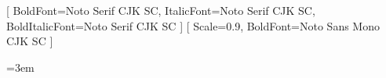 \usepackage{fontspec}
\setmainfont{Noto Serif CJK SC}[
  BoldFont=Noto Serif CJK SC,
  ItalicFont=Noto Serif CJK SC,
  BoldItalicFont=Noto Serif CJK SC
]
\setmonofont{Noto Sans Mono CJK SC}[
  Scale=0.9,
  BoldFont=Noto Sans Mono CJK SC
]

\usepackage[a4paper,margin=2.5cm,top=2cm,bottom=2.5cm]{geometry}
\usepackage{setspace}
\onehalfspacing

\usepackage{fancyhdr}
\fancyhf{}
\fancyfoot[C]{\thepage}
\renewcommand{\headrulewidth}{0.4pt}
\pagestyle{fancy}

\usepackage{xcolor}
\usepackage{hyperref}
\hypersetup{
  colorlinks=true,
  linkcolor=linkblue,
  urlcolor=linkblue,
  citecolor=linkblue
}

\usepackage{longtable}
\usepackage{booktabs}
\usepackage{array}
\usepackage{etoolbox}
\setlength{\tabcolsep}{4pt}
\renewcommand{\arraystretch}{1.2}


\let\oldtexttt\texttt
\renewcommand{\texttt}[1]{%
  \oldtexttt{\hyphenchar\font=`\-\relax\fontdimen3\font=0.3em\relax #1}%
}

\usepackage{enumitem}

\usepackage{caption}
\captionsetup{font=small,labelfont=bf}

\emergencystretch=3em
